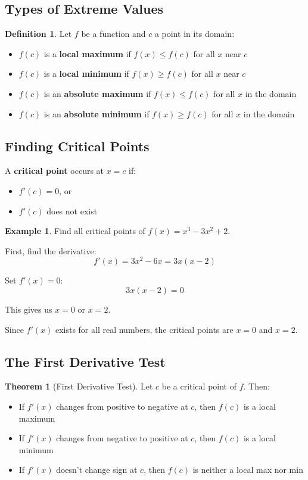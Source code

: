 \documentclass[12pt,a4paper]{book}
\theoremstyle{definition}
\newtheorem{definition}{Definition}[chapter]
\newtheorem{example}{Example}[chapter]
\newtheorem{theorem}{Theorem}[chapter]
\begin{document}
\subsection{Types of Extreme Values}

\begin{definition}
Let $f$ be a function and $c$ a point in its domain:
\begin{itemize}
    \item $f(c)$ is a \textbf{local maximum} if $f(x) \leq f(c)$ for all $x$ near $c$
    \item $f(c)$ is a \textbf{local minimum} if $f(x) \geq f(c)$ for all $x$ near $c$
    \item $f(c)$ is an \textbf{absolute maximum} if $f(x) \leq f(c)$ for all $x$ in the domain
    \item $f(c)$ is an \textbf{absolute minimum} if $f(x) \geq f(c)$ for all $x$ in the domain
\end{itemize}
\end{definition}

\subsection{Finding Critical Points}

\begin{keyformula}
A \textbf{critical point} occurs at $x = c$ if:
\begin{itemize}
    \item $f'(c) = 0$, or
    \item $f'(c)$ does not exist
\end{itemize}
\end{keyformula}

\begin{example}
Find all critical points of $f(x) = x^3 - 3x^2 + 2$.

First, find the derivative:
$$f'(x) = 3x^2 - 6x = 3x(x - 2)$$

Set $f'(x) = 0$:
$$3x(x - 2) = 0$$

This gives us $x = 0$ or $x = 2$.

Since $f'(x)$ exists for all real numbers, the critical points are $x = 0$ and $x = 2$.
\end{example}

\subsection{The First Derivative Test}

\begin{theorem}[First Derivative Test]
Let $c$ be a critical point of $f$. Then:
\begin{itemize}
    \item If $f'(x)$ changes from positive to negative at $c$, then $f(c)$ is a local maximum
    \item If $f'(x)$ changes from negative to positive at $c$, then $f(c)$ is a local minimum
    \item If $f'(x)$ doesn't change sign at $c$, then $f(c)$ is neither a local max nor min
\end{itemize}
\end{theorem}
\end{document}
